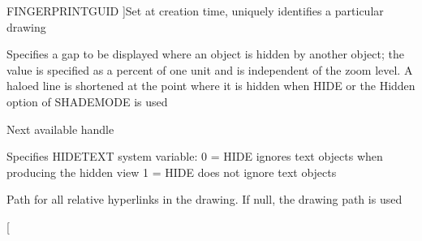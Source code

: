 \begin{Desc}
\begin{description}
{F\+I\+N\+G\+E\+R\+P\+R\+I\+N\+T\+G\+U\+ID\hypertarget{class_c_a_d_header_abd894aab7aa85b4c4634e67fb93d6886a5b049d1bdddd729d5c50f8b4329d868f}{}\label{class_c_a_d_header_abd894aab7aa85b4c4634e67fb93d6886a5b049d1bdddd729d5c50f8b4329d868f}
}]Set at creation time, uniquely identifies a particular drawing \item[{\em 
H\+A\+L\+O\+G\+AP\hypertarget{class_c_a_d_header_abd894aab7aa85b4c4634e67fb93d6886a228b8cc6b7683b1089fcb78a6ed54027}{}\label{class_c_a_d_header_abd894aab7aa85b4c4634e67fb93d6886a228b8cc6b7683b1089fcb78a6ed54027}
}]Specifies a gap to be displayed where an object is hidden by another object; the value is specified as a percent of one unit and is independent of the zoom level. A haloed line is shortened at the point where it is hidden when H\+I\+DE or the Hidden option of S\+H\+A\+D\+E\+M\+O\+DE is used \item[{\em 
H\+A\+N\+D\+S\+E\+ED\hypertarget{class_c_a_d_header_abd894aab7aa85b4c4634e67fb93d6886a8350730cc6af4e40d5f221cbef7db728}{}\label{class_c_a_d_header_abd894aab7aa85b4c4634e67fb93d6886a8350730cc6af4e40d5f221cbef7db728}
}]Next available handle \item[{\em 
H\+I\+D\+E\+T\+E\+XT\hypertarget{class_c_a_d_header_abd894aab7aa85b4c4634e67fb93d6886a75327037466fbd7ebadc7dd94e3c8cd6}{}\label{class_c_a_d_header_abd894aab7aa85b4c4634e67fb93d6886a75327037466fbd7ebadc7dd94e3c8cd6}
}]Specifies H\+I\+D\+E\+T\+E\+XT system variable\+: 0 = H\+I\+DE ignores text objects when producing the hidden view 1 = H\+I\+DE does not ignore text objects \item[{\em 
H\+Y\+P\+E\+R\+L\+I\+N\+K\+B\+A\+SE\hypertarget{class_c_a_d_header_abd894aab7aa85b4c4634e67fb93d6886a9654d04ccd7e6bdceffbe51f9c37849c}{}\label{class_c_a_d_header_abd894aab7aa85b4c4634e67fb93d6886a9654d04ccd7e6bdceffbe51f9c37849c}
}]Path for all relative hyperlinks in the drawing. If null, the drawing path is used \item[{\em 
}
\end{description}
\end{Desc}
